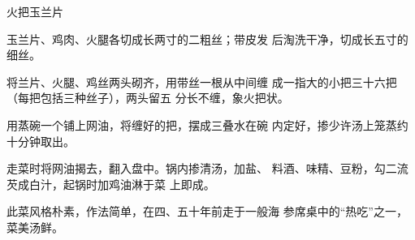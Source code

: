\begin{recipe}{火把玉兰片}

\ingredients



\cooking

\step 玉兰片、鸡肉、火腿各切成长两寸的二粗丝；带皮发 后淘洗干净，切成长五寸的细丝。

\step 将兰片、火腿、鸡丝两头砌齐，用带丝一根从中间缠 成一指大的小把三十六把（每把包括三种丝子），两头留五 分长不缠，象火把状。

\step 用蒸碗一个铺上网油，将缠好的把，摆成三叠水在碗 内定好，掺少许汤上笼蒸约十分钟取出。

\step 走菜时将网油揭去，翻入盘中。锅内掺清汤，加盐、 料酒、味精、豆粉，勾二流芡成白汁，起锅时加鸡油淋于菜 上即成。

\notes

此菜风格朴素，作法简单，在四、五十年前走于一般海 参席桌中的“热吃”之一，菜美汤鲜。

\end{recipe}

